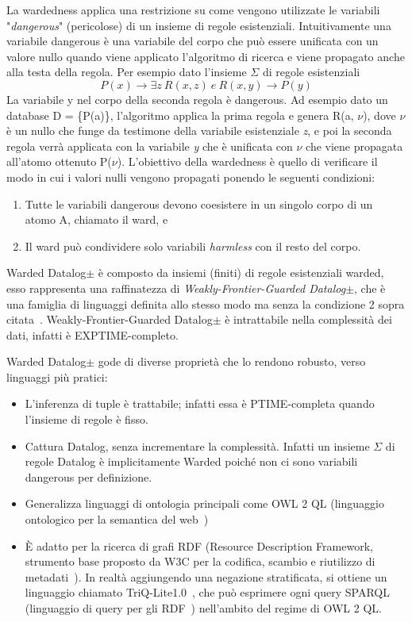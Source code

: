 La wardedness applica una restrizione su come vengono utilizzate le variabili "\textit{dangerous}" (pericolose) di un insieme di regole esistenziali. Intuitivamente una variabile dangerous è una variabile del corpo che può essere unificata con un valore nullo quando viene applicato l'algoritmo di ricerca e viene propagato anche alla testa della regola.\newline
Per esempio dato l'insieme $\Sigma$ di regole esistenziali \[P(x) \rightarrow \exists z~R(x,z)~e~R(x,y) \rightarrow P(y)\]
La variabile y nel corpo della seconda regola è dangerous. Ad esempio dato un database D = \{P(a)\}, l'algoritmo applica la prima regola e genera R(a, $\nu$), dove $\nu$ è un nullo che funge da testimone della variabile esistenziale \textit{z}, e poi la seconda regola verrà applicata con la variabile \textit{y} che è unificata con $\nu$ che viene propagata all'atomo ottenuto P($\nu$). \newline
L'obiettivo della wardedness è quello di verificare il modo in cui i valori nulli vengono propagati ponendo le seguenti condizioni: 

\begin{enumerate}
	\item  Tutte le variabili dangerous devono coesistere in un singolo corpo di un atomo A, chiamato il ward, e 
	\item Il ward può condividere solo variabili \textit{harmless} con il resto del corpo.
\end{enumerate}

Warded Datalog$\pm$ è composto da insiemi (finiti) di regole esistenziali warded, esso rappresenta una raffinatezza di \textit{Weakly-Frontier-Guarded Datalog$\pm$}, che è una famiglia di linguaggi definita allo stesso modo ma senza la condizione 2 sopra citata~\cite{baget2011rules}.
Weakly-Frontier-Guarded Datalog$\pm$ è intrattabile nella complessità dei dati, infatti è EXPTIME-completo. \newline 

Warded Datalog$\pm$ gode di diverse proprietà che lo rendono robusto, verso linguaggi più pratici:

\begin{itemize}
	\item L'inferenza di tuple è trattabile; infatti essa è PTIME-completa quando l'insieme di regole è fisso.
	\item Cattura Datalog, senza incrementare la complessità. Infatti un insieme $\Sigma$ di regole Datalog è implicitamente Warded poiché non ci sono variabili dangerous per definizione.
	\item Generalizza linguaggi di ontologia principali come OWL 2 QL (linguaggio ontologico per la semantica del web~\cite{OWL2QL})
	\item È adatto per la ricerca di grafi RDF (Resource Description Framework, strumento base proposto da W3C per la codifica, scambio e riutilizzo di metadati~\cite{RDFW3C}). In realtà aggiungendo una negazione stratificata, si ottiene un linguaggio chiamato TriQ-Lite1.0~\cite{gottlob2015beyond}, che può esprimere ogni query SPARQL (linguaggio di query per gli RDF~\cite{SPARQLW3C}) nell'ambito del regime di OWL 2 QL.
\end{itemize}




